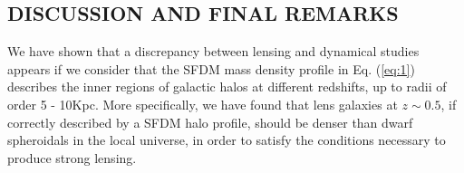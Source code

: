 \documentclass[8pt,letterpaper,twocolumn]{article}
\begin{document}
\begin{multicols}{2}

\section{DISCUSSION AND FINAL REMARKS}

\vspace{3mm}
We have shown that a discrepancy between lensing and dynamical studies appears if we consider that the SFDM mass density profile in Eq. (\ref{eq:1}) describes the inner regions of galactic halos at different redshifts, up to radii of order 5 - 10Kpc. More specifically, we have found that lens galaxies at $z \sim 0.5$, if correctly described by a SFDM halo profile, should be denser than dwarf spheroidals in the local universe, in order to satisfy the conditions necessary to produce strong lensing.\\


\end{multicols}
\end{document}

